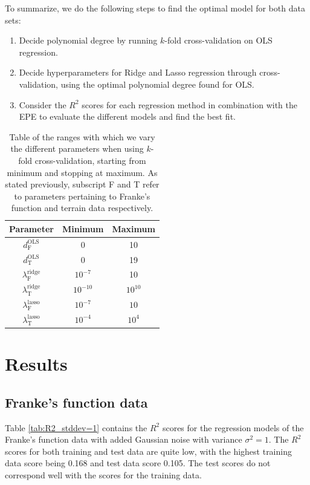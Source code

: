 \documentclass[a4paper, 10pt]{article}
\begin{document}
\begin{multicols}{2}
To summarize, we do the following steps to find the optimal model for both data sets:
\begin{enumerate}
\item Decide polynomial degree by running $k$-fold cross-validation on OLS regression.
\item Decide hyperparameters for Ridge and Lasso regression through cross-validation, using the optimal polynomial degree found for OLS.
\item Consider the $R^2$ scores for each regression method in combination with the EPE to evaluate the different models and find the best fit. 
\end{enumerate}

\begin{table}[H]
\caption{Table of the ranges with which we vary the different parameters when using $k$-fold cross-validation, starting from minimum and stopping at maximum. As stated previously, subscript F and T refer  to parameters pertaining to Franke's function and terrain data respectively.}
\label{tab:parameters_kfold}
\centering
{\setlength{\extrarowheight}{4pt}
\begin{tabular}{| c | c | c |} \hline
Parameter & Minimum & Maximum  \\ \hline
$d_\text{F}^\text{OLS}$ & 0 & 10 \\ \hline 
$d_\text{T}^\text{OLS}$ & 0 & 19 \\ \hline 
$\lambda^\text{ridge}_\text{F}$  & $10^{-7}$ & 10\\ \hline 
$\lambda^\text{ridge}_\text{T}$ & $10^{-10}$ & $10^{10}$\\ \hline 
$\lambda^\text{lasso}_\text{F}$  & $10^{-7}$ & $10$\\ \hline 
$\lambda^\text{lasso}_\text{T}$ & $10^{-4}$ & $10^{4}$\\ \hline 
\end{tabular}}
\end{table}





\section{Results}
\subsection{Franke's function data}
Table \ref{tab:R2_stddev=1} contains the $R^2$ scores for the regression models of the Franke's function data with added Gaussian noise with variance $\sigma^2 = 1$. The $R^2$ scores for both training and test data are quite low, with the highest training data score being 0.168 and test data score 0.105. The test scores do not correspond well with the scores for the training data.


\end{multicols}
\end{document}
